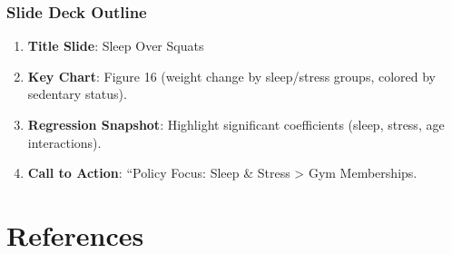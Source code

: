 \documentclass[
  man,floatsintext]{apa6}
\providecommand{\tightlist}{%
  \setlength{\itemsep}{0pt}\setlength{\parskip}{0pt}}
\begin{document}
\subsubsection{\texorpdfstring{\textbf{Slide Deck Outline}}{Slide Deck Outline}}\label{slide-deck-outline}

\begin{enumerate}
\def\labelenumi{\arabic{enumi}.}
\tightlist
\item
  \textbf{Title Slide}: Sleep Over Squats
\item
  \textbf{Key Chart}: Figure 16 (weight change by sleep/stress groups, colored by sedentary status).\\
\item
  \textbf{Regression Snapshot}: Highlight significant coefficients (sleep, stress, age interactions).\\
\item
  \textbf{Call to Action}: ``Policy Focus: Sleep \& Stress \textgreater{} Gym Memberships.
\end{enumerate}

\newpage

\section{References}\label{references}
\end{document}
